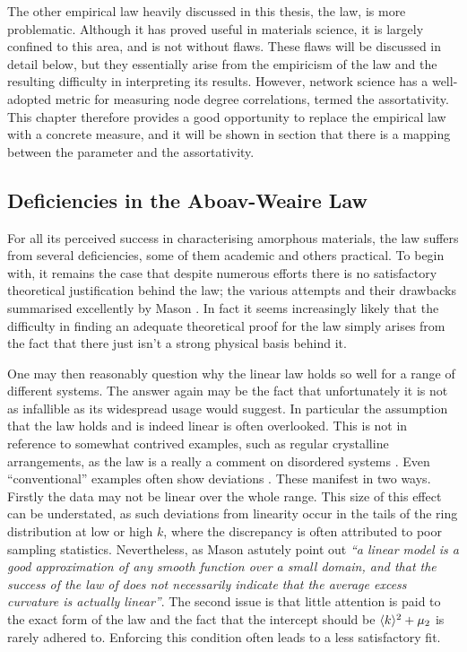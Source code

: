 The other empirical law heavily discussed in this thesis, the \aw{} law, is more problematic.
Although it has proved useful in materials science, it is largely confined to this area, and is not without flaws.
These flaws will be discussed in detail below, but they essentially arise from the empiricism of the law and the resulting difficulty in interpreting its results.
However, network science has a well\--adopted metric for measuring node degree correlations, termed the assortativity.  
This chapter therefore provides a good opportunity to replace the empirical \aw{} law with a concrete measure, and it will be shown in section  that there is a mapping between the \aw{} parameter and the assortativity.

\subsection{Deficiencies in the Aboav\--Weaire Law}

For all its perceived success in characterising amorphous materials, the \aw{} law suffers from several deficiencies, some of them academic and others practical.
To begin with, it remains the case that despite numerous efforts \cite{Lambert1981,Kumar1994,Blanc1979,Rivier1985,Peshkin1991,Chiu1994} there is no satisfactory theoretical justification behind the \aw{} law; the various attempts and their drawbacks summarised excellently by Mason \etal{} \cite{Mason2012}.
In fact it seems increasingly likely that the difficulty in finding an adequate theoretical proof for the \aw{} law simply arises from the fact that there just isn't a strong physical basis behind it.

One may then reasonably question why the linear \aw{} law holds so well for a range of different systems.
The answer again may be the fact that unfortunately it is not as infallible as its widespread usage would suggest.
In particular the assumption that the law holds and is indeed linear is often overlooked.
This is not in reference to somewhat contrived examples, such as regular crystalline arrangements, as the \aw{} law is a really a comment on disordered systems \cite{Boots1984}.
Even ``conventional'' examples often show deviations \cite{Earnshaw1994,Kumar1994,Hilhorst2006}.
These manifest in two ways.
Firstly the data may not be linear over the whole range.
This size of this effect can be understated, as such deviations from linearity occur in the tails of the ring distribution at low or high $k$, where the discrepancy is often attributed to poor sampling statistics.
Nevertheless, as Mason \etal{} astutely point out \textit{``a linear model is a good approximation of any smooth function over a small domain, and that the success of the law of \aw{} does not necessarily indicate that the average excess curvature is actually linear''}.
The second issue is that little attention is paid to the exact form of the law and the fact that the intercept should be $\langle k \rangle^2+\mu_2$ is rarely adhered to.
Enforcing this condition often leads to a less satisfactory fit. 

